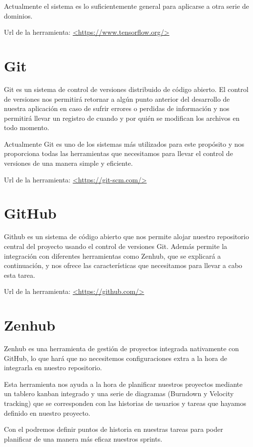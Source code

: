 Actualmente el sistema es lo suficientemente general para aplicarse a otra serie de dominios.

Url de la herramienta: \url{<https://www.tensorflow.org/>}

\section{Git}

Git es un sistema de control de versiones distribuido de código abierto. El control de versiones nos permitirá retornar a algún punto anterior del desarrollo de nuestra aplicación en caso de sufrir errores o perdidas de información y nos permitirá llevar un registro de cuando y por quién se modifican los archivos en todo momento.

Actualmente Git es uno de los sistemas más utilizados para este propósito y nos proporciona todas las herramientas que necesitamos para llevar el control de versiones de una manera simple y eficiente.

Url de la herramienta: \url{<https://git-scm.com/>}

\section{GitHub}

Github es un sistema de código abierto que nos permite alojar nuestro repositorio central del proyecto usando el control de versiones Git. Además permite la integración con diferentes herramientas como Zenhub, que se explicará a continuación, y nos ofrece las características que necesitamos para llevar a cabo esta tarea.

Url de la herramienta: \url{<https://github.com/>}

\section{Zenhub}

Zenhub es una herramienta de gestión de proyectos integrada nativamente con GitHub, lo que hará que no necesitemos configuraciones extra a la hora de integrarla en nuestro repositorio. 

Esta herramienta nos ayuda a la hora de planificar nuestros proyectos mediante un tablero kanban integrado y una serie de diagramas (Burndown y Velocity tracking) que se corresponden con las historias de usuarios y tareas que hayamos definido en nuestro proyecto.

Con el podremos definir puntos de historia en nuestras tareas para poder planificar de una manera más eficaz nuestros sprints.

